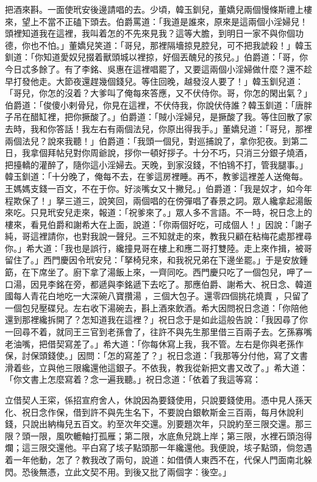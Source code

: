 \begin{showcontents}{}
把酒來斟。一面使玳安後邊請唱的去。少頃，韓玉釧兒，董嬌兒兩個慢條斯禮上樓來，望上不當不正磕下頭去。伯爵罵道：「我道是誰來，原來是這兩個小淫婦兒！頭裡知道我在這裡，我叫着怎的不先來見我？這等大膽，到明日一家不與你個功德，你也不怕。」董嬌兒笑道：「哥兒，那裡隔墻掠見腔兒，可不把我諕殺！」韓玉釧道：「你知道愛奴兒掇着獸頭城以裡掠，好個丟醜兒的孩兒。」伯爵道：「哥，你今日忒多餘了。有了李銘、吳惠在這裡唱罷了，又要這兩個小淫婦做什麼？還不趁早打發他走。大節夜還趕幾個錢兒。等住回晚，越發沒人要了！」韓玉釧兒道：「哥兒，你怎的沒着？大爹叫了俺每來答應，又不伏侍你。哥，你怎的閑出氣？」伯爵道：「俊傻小剌骨兒，你見在這裡，不伏侍我，你說伏侍誰？韓玉釧道：「唐胖子吊在醋缸裡，把你撅酸了。」伯爵道：「賊小淫婦兒，是撅酸了我。等住回散了家去時，我和你答話！我左右有兩個法兒，你原出得我手。」董嬌兒道：「哥兒，那裡兩個法兒？說來我聽！」伯爵道：「我頭一個兒，對巡捕說了，拿你犯夜。到第二日，我拿個拜帖兒對你周爺說，拶你一頓好拶子。十分不巧，只消三分銀子燒酒，把擡轎的灌醉了，隨你這小淫婦去。天晚，到家沒錢，不怕鴇不打，管我腿事。」韓玉釧道：「十分晚了，俺每不去，在爹這房裡睡。再不，教爹這裡差人送俺每。王媽媽支錢一百文，不在于你。好淡嘴女又十撇兒。」伯爵道：「我是奴才，如今年程欺保了！」拏三道三，說笑回，兩個唱的在傍彈唱了春景之詞。眾人纔拿起湯飯來吃。只見玳安兒走來，報道：「祝爹來了。」眾人多不言語。不一時，祝日念上的樓來，看見伯爵和謝希大在上面，說道：「你兩個好吃，可成個人！」因說：「謝子純，哥這裡請你，也對我說一聲兒。三不知就走的來，教我只顧在粘梅花處那裡尋你。」希大道：「我也是誤行，纔撞見哥在樓上和應二哥打雙陸。走上來作揖，被哥留住了。」西門慶因令玳安兒：「拏椅兒來，和我祝兄弟在下邊坐罷。」于是安放鍾筯，在下席坐了。廚下拿了湯飯上來，一齊同吃。西門慶只吃了一個包兒，呷了一口湯，因見李銘在旁，都遞與李銘遞下去吃了。那應伯爵、謝希大、祝日念、韓道國每人青花白地吃一大深碗八寶攢湯 ，三個大包子。還零四個挑花燒賣 ，只留了一個包兒壓碟兒。左右收下湯碗去，斟上酒來飲酒。希大因問祝日念道：「你陪他還到那裡纔拆開了？怎知道我在這裡？」祝日念于是如此這般告說：「我因尋了你一回尋不着，就同王三官到老孫會了，往許不與先生那里借三百兩子去。乞孫寡嘴老油嘴，把借契寫差了。」希大道：「你每休寫上我，我不管。左右是你與老孫作保，討保頭錢使。」因問：「怎的寫差了？」祝日念道：「我那等分付他，寫了文書滑着些，立與他三限纔還他這銀子。不依我，教我從新把文書又改了。」希大道：「你文書上怎麼寫着？念一遍我聽。」祝日念道：「依着了我這等寫：

立借契人王寀，係招宣府舍人，休說因為要錢使用，只說要錢使用。憑中見人孫天化、祝日念作保，借到許不與先生名下，不要說白銀軟斯金三百兩，每月休說利錢，只說出納梅兒五百文。約至次年交還。別要題次年，只說約至三限交還。那三限？頭一限，風吹轆軸打孤雁；第二限，水底魚兒跳上岸；第三限，水裡石頭泡得爛；這三限交還他。平白寫了垓子點頭那一年纔還他。我便說，垓子點頭，倘忽遇着一年他動，怎了？教我改了兩句，說道：如借債人東西不在，代保人門面南北躲閃。恐後無憑，立此文契不用。到後又批了兩個字：後空。」


\end{showcontents}
